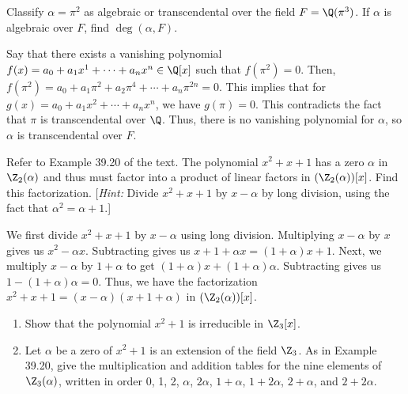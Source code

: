 \begin{problem}[39.16]
  Classify $\alpha = \pi^2$ as algebraic or transcendental over the field $F = \Q(\pi^3)$. If $\alpha$ is algebraic over $F$, find $\deg(\alpha, F)$.
\end{problem}

\begin{solution}
  Say that there exists a vanishing polynomial $f(x) = a_0 + a_1x^1 + \cdots + a_nx^n \in \Q[x]$ such that $f(\pi^2) = 0$. Then, $f(\pi^2) = a_0 + a_1\pi^2 + a_2\pi^4 + \cdots + a_n\pi^{2n} = 0$. This implies that for $g(x) = a_0 + a_1x^2 + \cdots + a_nx^n$, we have $g(\pi) = 0$. This contradicts the fact that $\pi$ is transcendental over $\Q$. Thus, there is no vanishing polynomial for $\alpha$, so $\alpha$ is transcendental over $F$.
\end{solution}

\begin{problem}[39.17]
  Refer to Example 39.20 of the text. The polynomial $x^2 + x + 1$ has a zero $\alpha$ in $\Z_2(\alpha)$ and thus must factor into a product of linear factors in $(\Z_2(\alpha))[x]$. Find this factorization. [\textit{Hint:} Divide $x^2 + x + 1$ by $x - \alpha$ by long division, using the fact that $\alpha^2 = \alpha + 1$.]
\end{problem}

\begin{solution}
  We first divide $x^2 + x + 1$ by $x - \alpha$ using long division. Multiplying $x - \alpha$ by $x$ gives us $x^2 - \alpha x$. Subtracting gives us $x + 1 + \alpha x = (1 + \alpha)x + 1$. Next, we multiply $x - \alpha$ by $1 + \alpha$ to get $(1 + \alpha)x + (1 + \alpha)\alpha$. Subtracting gives us $1 - (1 + \alpha)\alpha = 0$. Thus, we have the factorization $x^2 + x + 1 = (x - \alpha)(x + 1 + \alpha)$ in $(\Z_2(\alpha))[x]$.
\end{solution}

\begin{problem}[39.18]
  \begin{enumerate}
    \item Show that the polynomial $x^2 + 1$ is irreducible in $\Z_3[x]$.
    \item Let $\alpha$ be a zero of $x^2 + 1$ is an extension of the field $\Z_3$. As in Example 39.20, give the multiplication and addition tables for the nine elements of $\Z_3(\alpha)$, written in order 0, 1, 2, $\alpha$, $2\alpha$, $1 + \alpha$, $1 + 2\alpha$, $2 + \alpha$, and $2 + 2\alpha$.
  \end{enumerate}
\end{problem}

